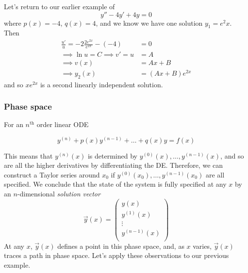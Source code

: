 \documentclass{../../template/note}
\begin{document}
    \begin{example}
        Let's return to our earlier example of
        \[
            y'' - 4y' + 4y = 0
        \]
        where \(p(x) = -4\), \(q(x) = 4\), and we know we have one solution \(y_1 = e^2x\). Then
        \begin{align*}
            \frac{u'}{u} = -2\frac{2e^{2x}}{e^{2x}} - (-4) &= 0 \\
            \implies \ln u = C \implies v' = u &= A \\
            \implies v(x) &= Ax + B \\
            \implies y_2(x) &= (Ax + B)e^{2x}
        \end{align*}
        and so \(xe^{2x}\) is a second linearly independent solution.
        
    \end{example}
    
    \subsubsection{Phase space}

    For an \(n^\text{th}\) order linear ODE

    \[
        y^{(n)} + p(x)y^{(n-1)} + \dots + q(x)y = f(x)
    \]

    This means that \(y^{(n)}(x)\) is determined by \(y^{(0)}(x), \dots, y^{(n-1)}(x)\), and so are all the higher derivatives by differentiating the DE. Therefore, we can construct a Taylor series around \(x_0\) if \(y^{(0)}(x_0), \dots, y^{(n-1)}(x_0)\) are all specified. We conclude that the state of the system is fully specified at any \(x\) by an \(n\)-dimensional \emph{solution vector}
    \[
        \vec y(x) = \begin{pmatrix}
         y(x) \\
         y^{(1)}(x) \\
         \vdots \\
         y^{(n-1)}(x) \\
        \end{pmatrix}
    \]
    At any \(x\), \(\vec y(x)\) defines a point in this phase space, and, as \(x\) varies, \(\vec y(x)\) traces a path in phase space. Let's apply these observations to our previous example.
\end{document}
